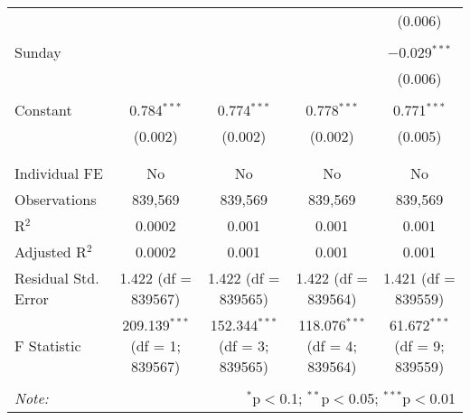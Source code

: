 \documentclass[
]{article}
\begin{document}
\begin{table}[!htbp]
{\begin{tabular}{@{\extracolsep{5pt}}lcccc}
  &  &  &  & (0.006) \\ 
  & & & & \\ 
 Sunday &  &  &  & $-$0.029$^{***}$ \\ 
  &  &  &  & (0.006) \\ 
  & & & & \\ 
 Constant & 0.784$^{***}$ & 0.774$^{***}$ & 0.778$^{***}$ & 0.771$^{***}$ \\ 
  & (0.002) & (0.002) & (0.002) & (0.005) \\ 
  & & & & \\ 
\hline \\[-1.8ex] 
Individual FE & No & No & No & No \\ 
Observations & 839,569 & 839,569 & 839,569 & 839,569 \\ 
R$^{2}$ & 0.0002 & 0.001 & 0.001 & 0.001 \\ 
Adjusted R$^{2}$ & 0.0002 & 0.001 & 0.001 & 0.001 \\ 
Residual Std. Error & 1.422 (df = 839567) & 1.422 (df = 839565) & 1.422 (df = 839564) & 1.421 (df = 839559) \\ 
F Statistic & 209.139$^{***}$ (df = 1; 839567) & 152.344$^{***}$ (df = 3; 839565) & 118.076$^{***}$ (df = 4; 839564) & 61.672$^{***}$ (df = 9; 839559) \\ 
\hline 
\hline \\[-1.8ex] 
\textit{Note:}  & \multicolumn{4}{r}{$^{*}$p$<$0.1; $^{**}$p$<$0.05; $^{***}$p$<$0.01} \\ 
\end{tabular}
} 
\end{table} 
\newpage
\end{document}
